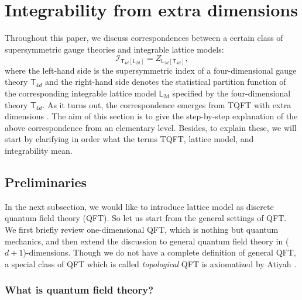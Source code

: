 




\section{Integrability from extra dimensions}


Throughout this paper, we discuss correspondences between
a certain class of supersymmetric gauge theories and integrable lattice
models: 
\begin{equation}
 \mathcal{I}_{\mathsf{T}_{4d}\left[\mathsf{L}_{2d}\right]}
	=  Z_{\mathsf{L}_{2d}\left[\mathsf{T}_{4d}\right]},
\end{equation}
where the left-hand side is the supersymmetric index of a four-dimensional
gauge theory $\mathsf{T}_{4d}$ and the right-hand side denotes the
statistical partition function of the corresponding integrable lattice
model $\mathsf{L}_{2d}$ specified by the four-dimensional theory
$\mathsf{T}_{4d}$. As it turns out, the correspondence emerges from
TQFT with extra dimensions \cite{Yagi:2015lha}. The aim of this section is
to give the step-by-step explanation of the above correspondence from
an elementary level. Besides, to explain these, we will start by clarifying
in order what the terms TQFT, lattice model, and integrability mean. 





\subsection{Preliminaries}

In the next subsection, we would like to introduce lattice model as
discrete quantum field theory (QFT). So let us start from the general
settings of QFT. We first briefly review one-dimensional QFT, which
is nothing but quantum mechanics, and then extend the discussion to
general quantum field theory in ($d+1$)-dimensions. Though we do
not have a complete definition of general QFT, a special class of
QFT which is called \emph{topological} QFT is axiomatized by Atiyah
\cite{Atiyah:1989vu}. 





\subsubsection{What is quantum field theory?}

